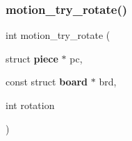 \mbox{\label{motion_8h_a249827f1bf1b0101949ba0818d13d8f5}} 
\subsubsection{motion\+\_\+try\+\_\+rotate()}
{\footnotesize\ttfamily int motion\+\_\+try\+\_\+rotate (\begin{DoxyParamCaption}\item[{struct \textbf{ piece} $\ast$}]{pc,  }\item[{const struct \textbf{ board} $\ast$}]{brd,  }\item[{int}]{rotation }\end{DoxyParamCaption})}

